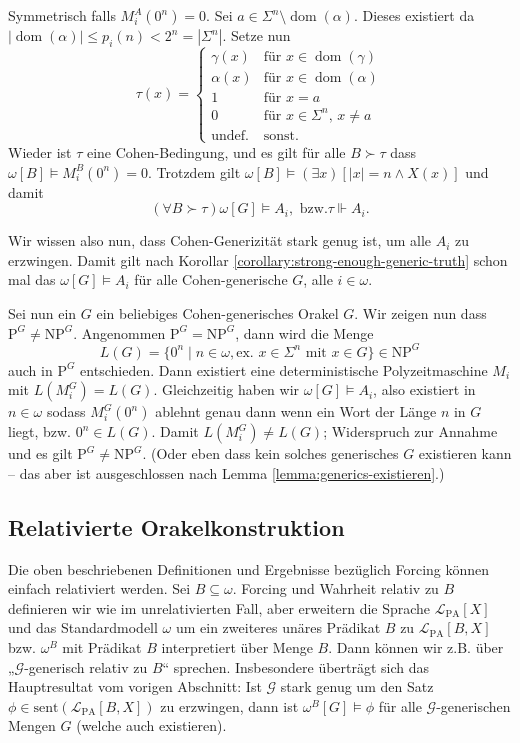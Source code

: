 \documentclass[nofonts]{uebung}
\theoremstyle{definition}
\def\P{\ensuremath{\mathrm{P}}}
\def\NP{\ensuremath{\mathrm{NP}}}
\DeclareMathOperator{\dom}{dom}
\begin{document}
Symmetrisch falls $M_i^A(0^n)=0$. Sei $a\in \Sigma^n\setminus\dom(\alpha)$. Dieses existiert da $|\dom(\alpha)|\leq p_i(n)<2^n=|\Sigma^n|$. Setze nun
\[ \tau(x) =\begin{cases} \gamma(x) & \text{für $x\in\dom(\gamma)$}\\\alpha(x) & \text{für $x\in\dom(\alpha)$}\\1&\text{für $x=a$}\\0&\text{für $x\in\Sigma^n$, $x\neq a$}\\\text{undef.} & \text{sonst}.\end{cases} \]
Wieder ist $\tau$ eine Cohen-Bedingung, und es gilt für alle $B\succ \tau$ dass $\omega[B] \vDash M_i^B(0^n)=0$.
Trotzdem gilt $\omega[B] \vDash (\exists x)[|x|=n\land X(x)]$ und damit
\[ (\forall B\succ \tau) \omega[G] \vDash A_i, \text{ bzw.} \tau\Vdash A_i. \]

Wir wissen also nun, dass Cohen-Generizität stark genug ist, um alle $A_i$ zu erzwingen. Damit gilt nach Korollar \ref{corollary:strong-enough-generic-truth} schon mal das $\omega[G]\vDash A_i$ für alle Cohen-generische $G$, alle $i\in\omega$.

Sei nun ein $G$ ein beliebiges Cohen-generisches Orakel $G$. Wir zeigen nun dass $\P^G\neq\NP^G$. Angenommen $\P^G=\NP^G$, dann wird die Menge
\[ L(G) = \{ 0^n \mid n\in\omega, \text{ex. $x\in\Sigma^n$ mit $x\in G$} \} \in\NP^G \]
auch in $\P^G$ entschieden.
Dann existiert eine deterministische Polyzeitmaschine $M_i$ mit $L(M_i^G)=L(G)$.
Gleichzeitig haben wir $\omega[G]\vDash A_i$, also existiert in $n\in\omega$ sodass $M_i^G(0^n)$ ablehnt genau dann wenn ein Wort der Länge $n$ in $G$ liegt, bzw. $0^n\in L(G)$. 
Damit $L(M_i^G)\neq L(G)$; Widerspruch zur Annahme und es gilt $\P^G\neq\NP^G$. (Oder eben dass kein solches generisches $G$ existieren kann -- das aber ist ausgeschlossen nach Lemma \ref{lemma:generics-existieren}.)

\subsection{Relativierte Orakelkonstruktion}

Die oben beschriebenen Definitionen und Ergebnisse bezüglich Forcing können einfach relativiert werden. Sei $B\subseteq \omega$. Forcing und Wahrheit relativ zu $B$ definieren wir wie im unrelativierten Fall, aber erweitern die Sprache $\mathcal L_{\mathrm{PA}}[X]$ und das Standardmodell $\omega$ um ein zweiteres unäres Prädikat $B$ zu $\mathcal L_{\mathrm{PA}}[B,X]$ bzw. $\omega^B$ mit Prädikat $B$ interpretiert über Menge $B$. Dann können wir z.B. über „$\mathcal G$-generisch relativ zu $B$“ sprechen.
Insbesondere überträgt sich das Hauptresultat vom vorigen Abschnitt: Ist $\mathcal G$ stark genug um den Satz $\phi\in \mathrm{sent}(\mathcal L_{\mathrm{PA}}[B,X])$ zu erzwingen, dann ist $\omega^B[G]\vDash \phi$ für alle $\mathcal G$-generischen Mengen $G$ (welche auch existieren).
\end{document}
